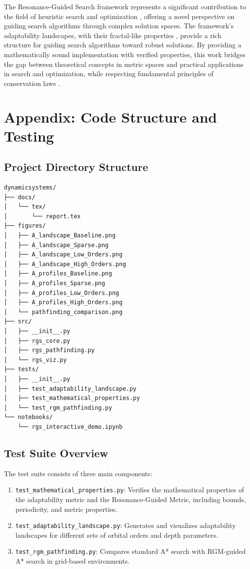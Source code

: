 \documentclass{article}
\begin{document}
The Resonance-Guided Search framework represents a significant contribution to the field of heuristic search and optimization \cite{heuristics}, offering a novel perspective on guiding search algorithms through complex solution spaces. The framework's adaptability landscapes, with their fractal-like properties \cite{fractals}, provide a rich structure for guiding search algorithms toward robust solutions. By providing a mathematically sound implementation with verified properties, this work bridges the gap between theoretical concepts in metric spaces \cite{metrics} and practical applications in search and optimization, while respecting fundamental principles of conservation laws \cite{conserved}.

\section{Appendix: Code Structure and Testing}

\subsection{Project Directory Structure}
\begin{verbatim}
dynamicsystems/
├── docs/
│   └── tex/
│       └── report.tex
├── figures/
│   ├── A_landscape_Baseline.png
│   ├── A_landscape_Sparse.png
│   ├── A_landscape_Low_Orders.png
│   ├── A_landscape_High_Orders.png
│   ├── A_profiles_Baseline.png
│   ├── A_profiles_Sparse.png
│   ├── A_profiles_Low_Orders.png
│   ├── A_profiles_High_Orders.png
│   └── pathfinding_comparison.png
├── src/
│   ├── __init__.py
│   ├── rgs_core.py
│   ├── rgs_pathfinding.py
│   └── rgs_viz.py
├── tests/
│   ├── __init__.py
│   ├── test_adaptability_landscape.py
│   ├── test_mathematical_properties.py
│   └── test_rgm_pathfinding.py
└── notebooks/
    └── rgs_interactive_demo.ipynb
\end{verbatim}

\subsection{Test Suite Overview}
The test suite consists of three main components:

\begin{enumerate}
    \item \texttt{test\_mathematical\_properties.py}: Verifies the mathematical properties of the adaptability metric and the Resonance-Guided Metric, including bounds, periodicity, and metric properties.
    \item \texttt{test\_adaptability\_landscape.py}: Generates and visualizes adaptability landscapes for different sets of orbital orders and depth parameters.
    \item \texttt{test\_rgm\_pathfinding.py}: Compares standard A* search with RGM-guided A* search in grid-based environments.
\end{enumerate}
\end{document}
